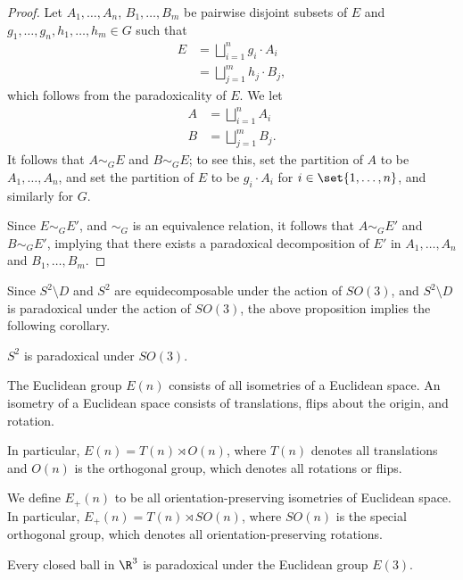 \documentclass[10pt]{mypackage}
\begin{document}
\begin{proof}
  Let $A_1,\dots,A_n$, $B_1,\dots,B_m$ be pairwise disjoint subsets of $E$ and $g_1,\dots,g_n,h_1,\dots,h_m\in G$ such that
  \begin{align*}
    E &= \bigsqcup_{i=1}^{n} g_i\cdot A_i\\
      &= \bigsqcup_{j=1}^{m}h_j\cdot B_j,
  \end{align*}
  which follows from the paradoxicality of $E$. We let
  \begin{align*}
    A &= \bigsqcup_{i=1}^{n}A_i\\
    B &= \bigsqcup_{j=1}^{m} B_j.
  \end{align*}
  It follows that $A\sim_{G} E$ and $B\sim_{G} E$; to see this, set the partition of $A$ to be $A_1,\dots,A_n$, and set the partition of $E$ to be $g_i\cdot A_i$ for $i\in \set{1,\dots,n}$, and similarly for $G$.\newline

  Since $E\sim_{G} E'$, and $\sim_{G}$ is an equivalence relation, it follows that $A\sim_{G}E'$ and $B\sim_{G}E'$, implying that there exists a paradoxical decomposition of $E'$ in $A_1,\dots,A_n$ and $B_1,\dots,B_m$.
\end{proof}
Since $S^{2}\setminus D$ and $S^{2}$ are equidecomposable under the action of $SO(3)$, and $S^{2}\setminus D$ is paradoxical under the action of $SO(3)$, the above proposition implies the following corollary.
\begin{corollary}
  $S^{2}$ is paradoxical under $SO(3)$.
\end{corollary}
\begin{definition}
  The Euclidean group $E(n)$ consists of all isometries of a Euclidean space. An isometry of a Euclidean space consists of translations, flips about the origin, and rotation.\newline

  In particular, $E(n) = T(n)\rtimes O(n)$, where $T(n)$ denotes all translations and $O(n)$ is the orthogonal group, which denotes all rotations or flips.\newline

  We define $E_{+}(n)$ to be all orientation-preserving isometries of Euclidean space. In particular, $E_{+}(n) = T(n)\rtimes SO(n)$, where $SO(n)$ is the special orthogonal group, which denotes all orientation-preserving rotations.
\end{definition}
\begin{corollary}
  Every closed ball in $\R^3$ is paradoxical under the Euclidean group $E(3)$.
\end{corollary}
\end{document}
